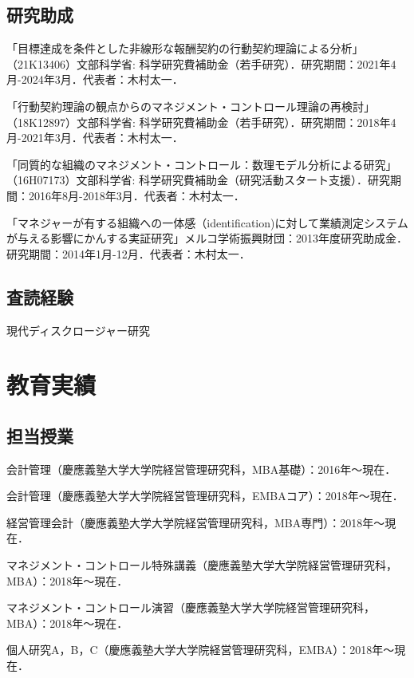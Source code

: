 \documentclass[letterpaper,uplatex]{article}
\renewenvironment{itemize}{
  \begin{list}{}{
    \setlength{\leftmargin}{1.5em}
  }
}{
  \end{list}
}
\begin{document}
\subsection*{研究助成}

\begin{itemize}
\item 「目標達成を条件とした非線形な報酬契約の行動契約理論による分析」（21K13406）文部科学省: 科学研究費補助金（若手研究）．研究期間：2021年4月-2024年3月．代表者：木村太一．

\item 「行動契約理論の観点からのマネジメント・コントロール理論の再検討」（18K12897）文部科学省: 科学研究費補助金（若手研究）．研究期間：2018年4月-2021年3月．代表者：木村太一．

\item 「同質的な組織のマネジメント・コントロール：数理モデル分析による研究」（16H07173）文部科学省: 科学研究費補助金（研究活動スタート支援）．研究期間：2016年8月-2018年3月．代表者：木村太一．

\item 「マネジャーが有する組織への一体感（identification)に対して業績測定システムが与える影響にかんする実証研究」メルコ学術振興財団：2013年度研究助成金．研究期間：2014年1月-12月．代表者：木村太一．
\end{itemize}

\subsection*{査読経験}
    \begin{itemize}
        \item 現代ディスクロージャー研究
    \end{itemize}

\section*{教育実績}

\subsection*{担当授業}

\begin{itemize}
    \item 会計管理（慶應義塾大学大学院経営管理研究科，MBA基礎）：2016年〜現在．
    \item 会計管理（慶應義塾大学大学院経営管理研究科，EMBAコア）：2018年〜現在．
    \item 経営管理会計（慶應義塾大学大学院経営管理研究科，MBA専門）：2018年〜現在．
    \item マネジメント・コントロール特殊講義（慶應義塾大学大学院経営管理研究科，MBA）：2018年〜現在．
    \item マネジメント・コントロール演習（慶應義塾大学大学院経営管理研究科，MBA）：2018年〜現在．
    \item 個人研究A，B，C（慶應義塾大学大学院経営管理研究科，EMBA）：2018年〜現在．
\end{itemize}
\end{document}
